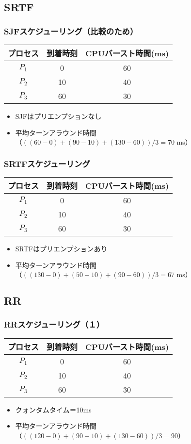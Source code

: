\documentclass[dvipdfmx]{beamer}
\begin{document}
\subsection{SRTF}
\begin{frame}
  \frametitle{SJFスケジューリング（比較のため）}
  \small\begin{tabular}{c c c}
    プロセス & 到着時刻 & CPUバースト時間(ms) \\
    \hline
    $P_1$    & 0  & 60 \\
    $P_2$    & 10 & 40 \\
    $P_3$    & 60 & 30 \\
  \end{tabular}
  \begin{itemize}
    \item SJFはプリエンプションなし
    \item 平均ターンアラウンド時間\\
      （$((60-0)+(90-10)+(130-60))/3=70$ ms）
  \end{itemize}
\end{frame}

\begin{frame}
  \frametitle{SRTFスケジューリング}
  \small\begin{tabular}{c c c}
    プロセス & 到着時刻 & CPUバースト時間(ms) \\
    \hline
    $P_1$    & 0  & 60 \\
    $P_2$    & 10 & 40 \\
    $P_3$    & 60 & 30 \\
  \end{tabular}
  \begin{itemize}
    \item SRTFはプリエンプションあり
    \item 平均ターンアラウンド時間\\
      （$((130-0)+(50-10)+(90-60))/3=67$ ms）
  \end{itemize}
\end{frame}

\subsection{RR}
\begin{frame}
  \frametitle{RRスケジューリング（１）}
  \small\begin{tabular}{c c c}
    プロセス & 到着時刻 & CPUバースト時間(ms) \\
    \hline
    $P_1$    & 0  & 60 \\
    $P_2$    & 10 & 40 \\
    $P_3$    & 60 & 30 \\
  \end{tabular}
  \begin{itemize}
    \item クォンタムタイム＝10ms
    \item 平均ターンアラウンド時間\\
      （$((120-0)+(90-10)+(130-60))/3=90$）
  \end{itemize}
\end{frame}
\end{document}

